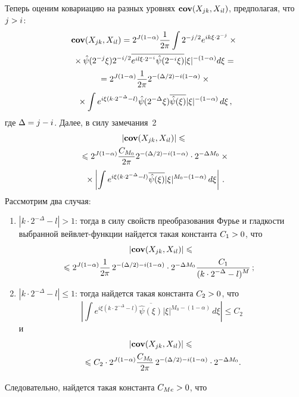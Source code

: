 \begin{multicols}{2}
Теперь оценим ковариацию на разных уровнях $\textbf{cov}(X_{jk},X_{il})$, предполагая, что $j\hm>i$:
\begin{multline*}
\textbf{cov}(X_{jk},X_{il}) = 2^{J(1-\alpha)} \displaystyle\frac{\displaystyle 1\mathstrut}{\displaystyle 2\pi\mathstrut} \int 
2^{-{j}/{2}}e^{ik\xi\cdot 2^{-j}}\times{}\\
{}\times \hat{\psi}(2^{-j}\xi) 
2^{-{i}/{2}} \overline{e^{il\xi\cdot 2^{-i}}\hat{\psi}(2^{-i}\xi)} 
|\xi|^{-(1-\alpha)} d \xi = {}\\
{}=2^{J(1-\alpha)}\displaystyle\frac{\displaystyle 1\mathstrut}{\displaystyle 2\pi\mathstrut}2^{-(\Delta/2)-i(1-\alpha)} \times{}\\
{}\times
\int e^{i\xi(k\cdot 2^{-\Delta}-l)}\hat{\psi}(2^{-\Delta}\xi) 
\overline{\hat{\psi}(\xi)} |\xi|^{-(1-\alpha)} \,d \xi\,,
\end{multline*}
где $\Delta\hm=j-i$. Далее, в силу замечания~2
\begin{multline*}
|\textbf{cov}(X_{jk},X_{il})|\leqslant{}\\
{}\leqslant
2^{J(1-\alpha)}\displaystyle\frac{\displaystyle C_{M_0}\mathstrut}{\displaystyle 2\pi\mathstrut}2^{-({\Delta}/{2})-i(1-\alpha)}\cdot
2^{-\Delta M_0} \times{}\\
{}\times
\left\vert
\int e^{i\xi(k\cdot2^{-\Delta}-l)} \overline{\hat{\psi}(\xi)} |\xi|^{M_0-(1-\alpha)}\,
d \xi \right\vert\,.
\end{multline*}
Рассмотрим два случая:
\begin{enumerate}[(1)]
\item $|k\cdot2^{-\Delta}-l| > 1$:
тогда в силу свойств преобразования Фурье и гладкости выбранной 
вейв\-лет-функ\-ции найдется такая константа $C_1\hm>0$, что
\begin{multline*}
|\cov(X_{jk},X_{il})|
\leqslant {}\\
\hspace*{-19pt}{}\leqslant 2^{J(1-\alpha)} \fr{1}{2\pi}\,2^{-({\Delta}/{2})-i(1-\alpha)}\cdot
2^{-\Delta M_0} \fr{C_1}{(k\cdot2^{-\Delta}-l)^M}\,;\hspace*{-8.9667pt} %
\end{multline*}

\item $|k\cdot2^{-\Delta}-l| \leqslant 1$: тогда найдется такая константа $C_2\hm>0$, что
\begin{equation*}
\left\vert \int e^{i\xi(k\cdot2^{-\Delta}-l)} \overline{\hat{\psi}(\xi)} 
|\xi|^{M_0-(1-\alpha)} \,d \xi \right\vert \leqslant C_2
\end{equation*}
и
\begin{multline*}
|\cov(X_{jk},X_{il})|
\leqslant {}\\
{}\leqslant C_2 \cdot 2^{J(1-\alpha)}\fr{C_{M_0}}{2\pi}\,
2^{-({\Delta}/{2})-i(1-\alpha)}\cdot 2^{-\Delta M_0}. %
\end{multline*}
\end{enumerate}
Следовательно, найдется такая константа $C_{Me}\hm>0$, что


\end{multicols}
